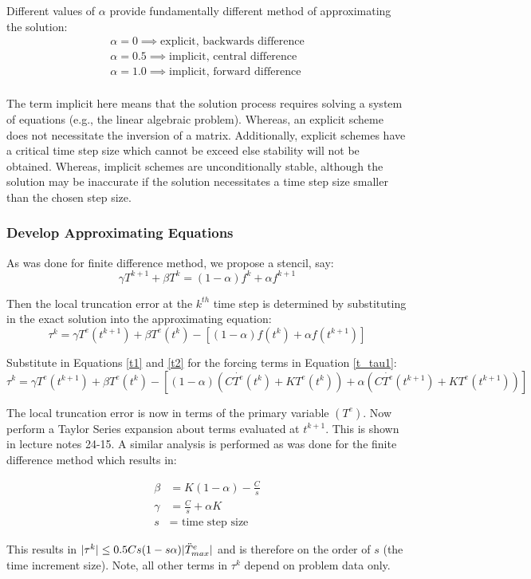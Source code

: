 \documentclass[letterpaper, 10pt, oneside]{article}
\newcommand{\be}{\begin{equation}}
\newcommand{\ee}{\end{equation}}
\newcommand{\as}[1]{\begin{align*}#1\end{align*}}
\DeclarePairedDelimiter\abs{\lvert}{\rvert}%
\begin{document}
Different values of $\alpha$ provide fundamentally different method of approximating the solution:
\as{\alpha = 0 \implies \text{explicit, backwards difference} \\
	\alpha = 0.5 \implies \text{implicit, central difference} \\
	\alpha = 1.0 \implies \text{implicit, forward difference} \\}

The term implicit here means that the solution process requires solving a system of equations (e.g., the linear algebraic problem).  Whereas, an explicit scheme does not necessitate the inversion of a matrix.  Additionally, explicit schemes have a critical time step size which cannot be exceed else stability will not be obtained.  Whereas, implicit schemes are unconditionally stable, although the solution may be inaccurate if the solution necessitates a time step size smaller than the chosen step size.

\subsubsection{Develop Approximating Equations}
As was done for finite difference method, we propose a stencil, say:
\be \gamma T^{k+1} + \beta T^k = (1-\alpha)f^k  + \alpha f^{k+1} \ee

Then the local truncation error at the $k^{th}$ time step is determined by substituting in the exact solution into the approximating equation:
\be \tau^k = \gamma T^e(t^{k+1}) + \beta T^e(t^k) - \left[(1-\alpha)f(t^k)  + \alpha f(t^{k+1}) \right] \label{t_tau1} \ee

Substitute in Equations \ref{t1} and \ref{t2} for the forcing terms in Equation \ref{t_tau1}:
\be \tau^k = \gamma T^e(t^{k+1}) + \beta T^e(t^k) - \left[(1-\alpha)(C\dot{T^e}(t^{k}) + KT^e(t^{k}) ) + \alpha (C\dot{T^e}(t^{k+1}) + KT^e(t^{k+1}) ) \right] \label{t_tau2} \ee

The local truncation error is now in terms of the primary variable $(T^e)$.  Now perform a Taylor Series expansion about terms evaluated at $t^{k+1}$.  This is shown in lecture notes 24-15.  A similar analysis is performed as was done for the finite difference method which results in:

\as{\beta &= K(1-\alpha) - \frac{C}{s}\\
	\gamma &= \frac{C}{s} + \alpha K\\
	s &= \text{ time step size}}

This results in $\abs{\tau^k} \le 0.5 Cs(1-s\alpha)\abs{\ddot{T}^e_{max}}$ and is therefore on the order of $s$ (the time increment size).  Note, all other terms in $\tau^k$ depend on problem data only.
\end{document}
